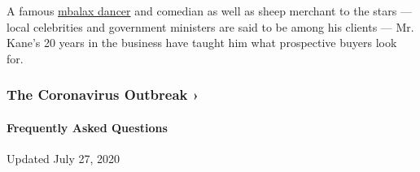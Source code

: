A famous \href{https://www.youtube.com/watch?v=SfeOEF8zvcs}{mbalax
dancer} and comedian as well as sheep merchant to the stars --- local
celebrities and government ministers are said to be among his clients
--- Mr. Kane's 20 years in the business have taught him what prospective
buyers look for.

\href{https://www.nytimes3xbfgragh.onion/news-event/coronavirus?action=click\&pgtype=Article\&state=default\&region=MAIN_CONTENT_3\&context=storylines_faq}{}

\hypertarget{the-coronavirus-outbreak-}{%
\subsubsection{The Coronavirus Outbreak
›}\label{the-coronavirus-outbreak-}}

\hypertarget{frequently-asked-questions}{%
\paragraph{Frequently Asked
Questions}\label{frequently-asked-questions}}

Updated July 27, 2020

